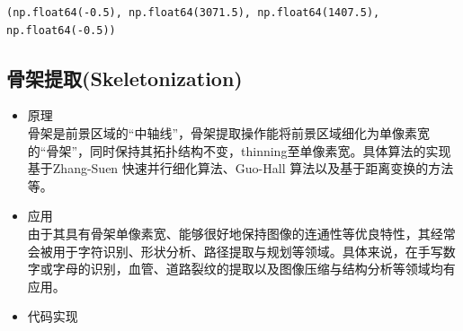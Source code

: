 \documentclass[11pt]{article}
\makeatletter
\newcommand{\boxspacing}{\kern\kvtcb@left@rule\kern\kvtcb@boxsep}
\newcommand{\prompt}[4]{
	{\ttfamily\llap{{\color{#2}[#3]:\hspace{3pt}#4}}\vspace{-\baselineskip}}
}
\makeatother
\begin{document}
            \begin{tcolorbox}[breakable, size=fbox, boxrule=.5pt, pad at break*=1mm, opacityfill=0]
\begin{Verbatim}[commandchars=\\\{\}]
(np.float64(-0.5), np.float64(3071.5), np.float64(1407.5), np.float64(-0.5))
\end{Verbatim}
\end{tcolorbox}
        
    \begin{center}
    \end{center}
    
    
      \subsection{骨架提取(Skeletonization)}
    \begin{itemize}
    	\item 原理\\
    	骨架是前景区域的“中轴线”，骨架提取操作能将前景区域细化为单像素宽的“骨架”，同时保持其拓扑结构不变，thinning至单像素宽。具体算法的实现基于Zhang-Suen 快速并行细化算法、Guo-Hall 算法以及基于距离变换的方法等。
    	\item 应用\\
    	由于其具有骨架单像素宽、能够很好地保持图像的连通性等优良特性，其经常会被用于字符识别、形状分析、路径提取与规划等领域。具体来说，在手写数字或字母的识别，血管、道路裂纹的提取以及图像压缩与结构分析等领域均有应用。
    	\item 代码实现
    	\begin{center}
    	\end{center}
    \end{itemize}
    
\end{document}
